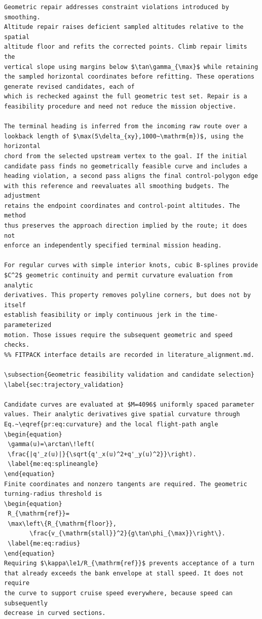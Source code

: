\documentclass[12pt]{article}
\begin{document}
\begin{verbatim}
Geometric repair addresses constraint violations introduced by smoothing.
Altitude repair raises deficient sampled altitudes relative to the spatial
altitude floor and refits the corrected points. Climb repair limits the
vertical slope using margins below $\tan\gamma_{\max}$ while retaining
the sampled horizontal coordinates before refitting. These operations
generate revised candidates, each of
which is rechecked against the full geometric test set. Repair is a
feasibility procedure and need not reduce the mission objective.

The terminal heading is inferred from the incoming raw route over a
lookback length of $\max(5\delta_{xy},1000~\mathrm{m})$, using the horizontal
chord from the selected upstream vertex to the goal. If the initial
candidate pass finds no geometrically feasible curve and includes a
heading violation, a second pass aligns the final control-polygon edge
with this reference and reevaluates all smoothing budgets. The adjustment
retains the endpoint coordinates and control-point altitudes. The method
thus preserves the approach direction implied by the route; it does not
enforce an independently specified terminal mission heading.

For regular curves with simple interior knots, cubic B-splines provide
$C^2$ geometric continuity and permit curvature evaluation from analytic
derivatives. This property removes polyline corners, but does not by itself
establish feasibility or imply continuous jerk in the time-parameterized
motion. Those issues require the subsequent geometric and speed checks.
%% FITPACK interface details are recorded in literature_alignment.md.

\subsection{Geometric feasibility validation and candidate selection}
\label{sec:trajectory_validation}

Candidate curves are evaluated at $M=4096$ uniformly spaced parameter
values. Their analytic derivatives give spatial curvature through
Eq.~\eqref{pr:eq:curvature} and the local flight-path angle
\begin{equation}
 \gamma(u)=\arctan\!left(
 \frac{|q'_z(u)|}{\sqrt{q'_x(u)^2+q'_y(u)^2}}\right).
 \label{me:eq:splineangle}
\end{equation}
Finite coordinates and nonzero tangents are required. The geometric
turning-radius threshold is
\begin{equation}
 R_{\mathrm{ref}}=
 \max\left\{R_{\mathrm{floor}},
       \frac{v_{\mathrm{stall}}^2}{g\tan\phi_{\max}}\right\}.
 \label{me:eq:radius}
\end{equation}
Requiring $\kappa\le1/R_{\mathrm{ref}}$ prevents acceptance of a turn
that already exceeds the bank envelope at stall speed. It does not require
the curve to support cruise speed everywhere, because speed can subsequently
decrease in curved sections.


\end{verbatim}
\end{document}

